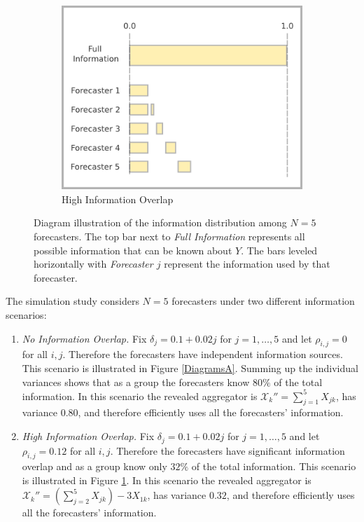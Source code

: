 \documentclass[11pt]{article}
\theoremstyle{definition}
\theoremstyle{definition}
\begin{document}
\begin{figure}[t!]
\begin{subfigure}[b]{0.49\textwidth}
                \includegraphics[width=\textwidth]{DepDiagram}
                \caption{High Information Overlap}
                \label{DiagramsB}
        \end{subfigure}
   \caption{Diagram illustration of the information distribution among $N = 5$ forecasters. The top bar next to \textit{Full Information} represents all possible information that can be known about $Y$. The bars leveled horizontally with \textit{Forecaster $j$} represent the information used by that forecaster.}    
        \label{Diagrams}
\end{figure}


The simulation study considers $N = 5$ forecasters under two different information scenarios: 
\begin{enumerate}
\item[] \textit{No Information Overlap.}  Fix $\delta_j = 0.1 + 0.02j$ for $j = 1, \dots, 5$ and let $\rho_{i,j} = 0$ for all $i,j$. Therefore the forecasters have independent information sources. This scenario is illustrated in Figure \ref{DiagramsA}. Summing up the individual variances shows that as a group the forecasters know $80\%$ of the total information. In this scenario the revealed aggregator is $\mathcal{X}_k'' = \sum_{j=1}^5 X_{jk}$, has variance $0.80$, and therefore efficiently uses all the forecasters' information.


\item[] \textit{High Information Overlap.} Fix $\delta_j = 0.1 + 0.02j$ for $j = 1, \dots, 5$ and let $\rho_{i,j} = 0.12$ for all $i,j$. Therefore the forecasters have significant information overlap and as a group know only $32\%$ of the total information. This scenario is illustrated in Figure \ref{DiagramsB}. In this scenario the revealed aggregator is $ \mathcal{X}_k'' = \left( \sum_{j=2}^5 X_{jk} \right) - 3X_{1k}$, has variance $0.32$, and therefore efficiently uses all the forecasters' information.
\end{enumerate}
\end{document}
